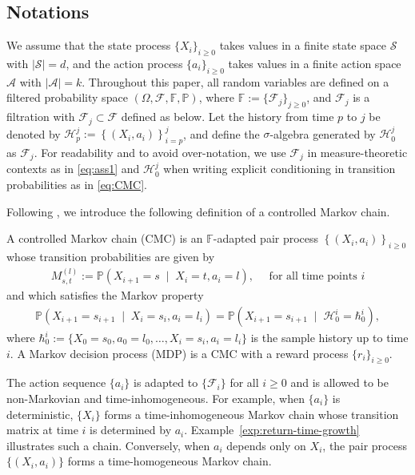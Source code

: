 \documentclass[twoside,11pt]{article}
\numberwithin{equation}{section}
\newcommand{\lp}{\left(}
\newcommand{\rp}{\right)}
\newcommand{\History}{\mathcal{H}}
\newcommand{\history}{\hbar}
\begin{document}
\subsection{Notations}  
We assume that the state process $\{X_i\}_{i \geq 0}$ takes values in a finite state space $\mathcal S$ with $|\mathcal S| = d$, and the action process $\{a_i\}_{i \geq 0}$ takes values in a finite action space $\mathcal A$ with $|\mathcal A| = k$.
Throughout this paper, all random variables are defined on a filtered probability space $(\Omega, \mathcal F, \mathbb F, \mathbb P)$, where $\mathbb F := \{\mathcal F_j\}_{j \geq 0}$, and $\mathcal F_j$ is a filtration with $\mathcal F_j \subset \mathcal F$ defined as below.
Let the history from time $p$ to $j$ be denoted by $\History_p^{j} := \left\{\lp X_i, a_i\rp\right\}_{i=p}^{j}$, and define the $\sigma$-algebra generated by $\History_0^{j}$ as $\mathcal F_j$.
For readability and to avoid over-notation, we use $\mathcal F_j$ in measure-theoretic contexts as in \cref{eq:ass1} and $\History_0^{j}$ when writing explicit conditioning in transition probabilities as in \cref{eq:CMC}.
 
Following \cite{borkar1991topics}, we introduce the following definition of a controlled Markov chain.

\begin{definition}
\label{def:CMC}
A controlled Markov chain (CMC) is an $\mathbb F$-adapted pair process $\left\{\lp X_i, a_i\rp\right\}_{i\geq 0}$
whose transition probabilities are given by
\begin{align}
\label{eq:CMC}
     M_{s,t}^{(l)} := \mathbb P\lp X_{i+1} = s \;\mid\; X_i = t, a_i = l \rp, \quad \text{ for all time points $i$}
\end{align}
and which satisfies the Markov property
\begin{align}
\mathbb P\lp X_{i+1} = s_{i+1} \;\mid\; X_i = s_i, a_i = l_i \rp = \mathbb P \lp X_{i+1} = s_{i+1} \;\mid\; \mathcal H_0^i = \history_0^i \rp, \nonumber
\end{align}
where $\history_0^i := \{X_0=s_0, a_0=l_0, \ldots, X_i=s_i, a_i=l_i\}$ is the sample history up to time $i$.
A Markov decision process (MDP) is a CMC with a reward process $\{r_i\}_{i \geq 0}$.
\end{definition}
The action sequence $\{a_i\}$ is adapted to $\{\mathcal F_i\}$ for all $i \geq 0$ and is allowed to be non-Markovian and time-inhomogeneous. 
For example, when $\{a_i\}$ is deterministic, $\{X_i\}$ forms a time-inhomogeneous Markov chain whose transition matrix at time $i$ is determined by $a_i$. 
Example~\ref{exp:return-time-growth} illustrates such a chain.
Conversely, when $a_i$ depends only on $X_i$, the pair process $\{(X_i,a_i)\}$ forms a time-homogeneous Markov chain.
\end{document}
